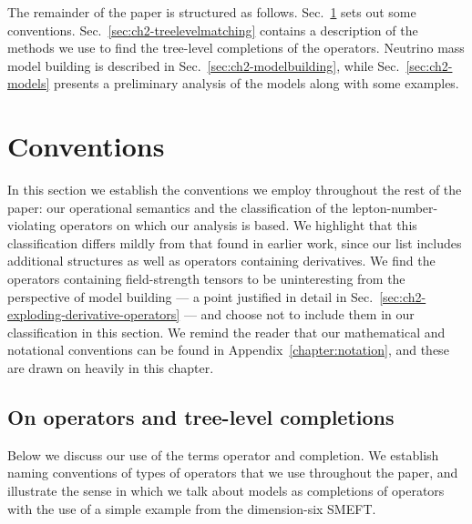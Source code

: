 The remainder of the paper is structured as follows.
Sec.~\ref{sec:ch2-conventions} sets out some conventions.
Sec.~\ref{sec:ch2-treelevelmatching} contains a description of the methods we
use to find the tree-level completions of the operators. Neutrino mass model
building is described in Sec.~\ref{sec:ch2-modelbuilding}, while
Sec.~\ref{sec:ch2-models} presents a preliminary analysis of the models along
with some examples.

\section{Conventions}
\label{sec:ch2-conventions}

In this section we establish the conventions we employ throughout the rest of
the paper: our operational semantics and the classification of the
lepton-number-violating operators on which our analysis is based. We highlight
that this classification differs mildly from that found in earlier work, since
our list includes additional structures as well as operators containing
derivatives. We find the operators containing field-strength tensors to be
uninteresting from the perspective of model building --- a point justified in
detail in Sec.~\ref{sec:ch2-exploding-derivative-operators} --- and choose not to
include them in our classification in this section. We remind the reader that
our mathematical and notational conventions can be found in
Appendix~\ref{chapter:notation}, and these are drawn on heavily in this chapter.

\subsection{On operators and tree-level completions}
\label{sec:ch2-operatorsandcompletions}

Below we discuss our use of the terms operator and completion. We establish
naming conventions of types of operators that we use throughout the paper, and
illustrate the sense in which we talk about models as completions of operators
with the use of a simple example from the dimension-six SMEFT.

